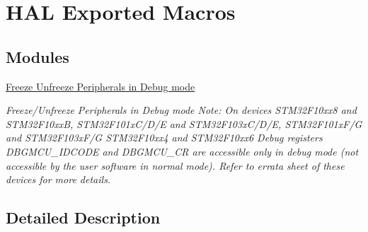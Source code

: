 \hypertarget{group___h_a_l___exported___macros}{}\section{H\+AL Exported Macros}
\label{group___h_a_l___exported___macros}
\subsection*{Modules}
\begin{DoxyCompactItemize}
\item 
\hyperlink{group___d_b_g_m_c_u___freeze___unfreeze}{Freeze Unfreeze Peripherals in Debug mode}
\begin{DoxyCompactList}\small\item\em Freeze/\+Unfreeze Peripherals in Debug mode Note\+: On devices S\+T\+M32\+F10xx8 and S\+T\+M32\+F10xxB, S\+T\+M32\+F101x\+C/\+D/E and S\+T\+M32\+F103x\+C/\+D/E, S\+T\+M32\+F101x\+F/G and S\+T\+M32\+F103x\+F/G S\+T\+M32\+F10xx4 and S\+T\+M32\+F10xx6 Debug registers D\+B\+G\+M\+C\+U\+\_\+\+I\+D\+C\+O\+DE and D\+B\+G\+M\+C\+U\+\_\+\+CR are accessible only in debug mode (not accessible by the user software in normal mode). Refer to errata sheet of these devices for more details. \end{DoxyCompactList}\end{DoxyCompactItemize}


\subsection{Detailed Description}
